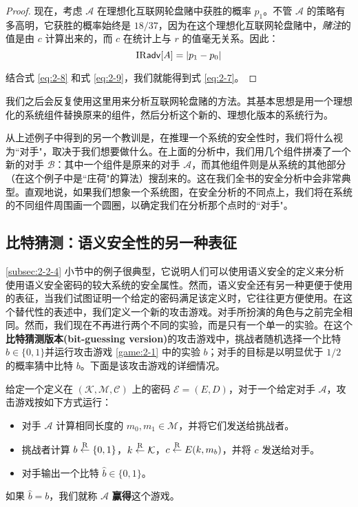 \begin{proof}
现在，考虑 $\mathcal{A}$ 在理想化互联网轮盘赌中获胜的概率 $p_1$。不管 $\mathcal{A}$ 的策略有多高明，它获胜的概率始终是 $18/37$，因为在这个理想化互联网轮盘赌中，\emph{赌注}的值是由 $c$ 计算出来的，而 $c$ 在统计上与 $r$ 的值毫无关系。因此：
\begin{equation}\label{eq:2-9}
{\rm IR\mathsf{adv}}[A]=|p_1-p_0|
\end{equation}

结合式 \ref{eq:2-8} 和式 \ref{eq:2-9}，我们就能得到式 \ref{eq:2-7}。
\end{proof}

我们之后会反复使用这里用来分析互联网轮盘赌的方法。其基本思想是用一个理想化的系统组件替换原来的组件，然后分析这个新的、理想化版本的系统行为。

从上述例子中得到的另一个教训是，在推理一个系统的安全性时，我们将什么视为``对手"，取决于我们想要做什么。在上面的分析中，我们用几个组件拼凑了一个新的对手 $\mathcal{B}$：其中一个组件是原来的对手 $\mathcal{A}$，而其他组件则是从系统的其他部分（在这个例子中是``庄荷"的算法）搜刮来的。这在我们全书的安全分析中会非常典型。直观地说，如果我们想象一个系统图，在安全分析的不同点上，我们将在系统的不同组件周围画一个圆圈，以确定我们在分析那个点时的``对手"。

\subsection{比特猜测：语义安全性的另一种表征}\label{subsec:2-2-5}

\ref{subsec:2-2-4} 小节中的例子很典型，它说明人们可以使用语义安全的定义来分析使用语义安全密码的较大系统的安全属性。然而，语义安全还有另一种更便于使用的表征，当我们试图证明一个给定的密码满足该定义时，它往往更方便使用。在这个替代性的表述中，我们定义一个新的攻击游戏。对手所扮演的角色与之前完全相同。然而，我们现在不再进行两个不同的实验，而是只有一个单一的实验。在这个\textbf{比特猜测版本(bit-guessing version)}的攻击游戏中，挑战者随机选择一个比特 $b\in\{0,1\}$并运行攻击游戏 \ref{game:2-1} 中的实验 $b$；对手的目标是以明显优于 ${1}/{2}$ 的概率猜中比特 $b$。下面是该攻击游戏的详细情况。

\begin{game}\label{game:2-4}
给定一个定义在 $(\mathcal{K},\mathcal{M},\mathcal{C})$ 上的密码 $\mathcal{E}=(E,D)$，对于一个给定对手 $\mathcal{A}$，攻击游戏按如下方式运行：
\begin{itemize}
	\item 对手 $\mathcal{A}$ 计算相同长度的 $m_0, m_1\in\mathcal{M}$，并将它们发送给挑战者。
	\item 挑战者计算 $b\overset{\rm R}\leftarrow\{0,1\}$，$k\overset{\rm R}\leftarrow\mathcal{K}$，$c\overset{\rm R}\leftarrow E(k,m_b)$，并将 $c$ 发送给对手。
	\item 对手输出一个比特 $\hat b\in\{0,1\}$。
\end{itemize}

如果 $\hat b=b$，我们就称 $\mathcal{A}$ \textbf{赢得}这个游戏。
\end{game}

